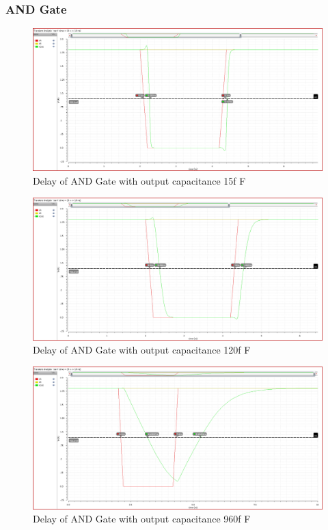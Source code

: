 \documentclass[conference]{IEEEtran}
\begin{document}
\subsubsection{AND Gate}
\begin{figure}[h!]
    \centering
    \includegraphics[width=0.9\linewidth]{and2_C1.png}
    \caption{Delay of AND Gate with output capacitance 15f F}
\end{figure}

\begin{figure}[h!]
    \centering
    \includegraphics[width=0.9\linewidth]{and2_C2.png}
    \caption{Delay of AND Gate with output capacitance 120f F}
\end{figure}

\begin{figure}[h!]
    \centering
    \includegraphics[width=0.9\linewidth]{and2_C3.png}
    \caption{Delay of AND Gate with output capacitance 960f F}
\end{figure}
\end{document}
